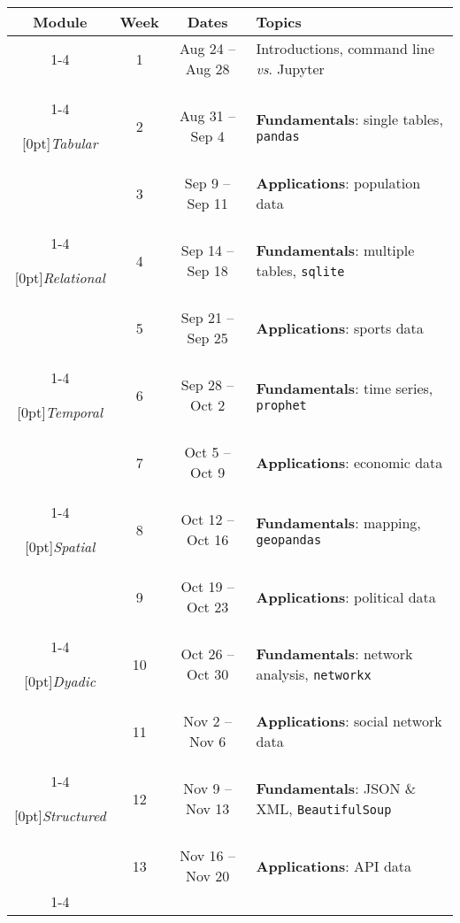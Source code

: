 \documentclass[10pt]{memoir}
\begin{document}
\begin{table}[h]
\centering
\begin{tabular}{cccl}
    \toprule[.15em]
    \textbf{Module} & \textbf{Week} & \textbf{Dates} & \textbf{Topics} \\
    \cmidrule[.1em](lr){1-4}
    
    & 1 & Aug 24 -- Aug 28 & Introductions, command line \textit{vs}. Jupyter \\
    \cmidrule[.1em](lr){1-4}
        
    \multirow{2}{*}[0pt]{\textit{Tabular}} %
        & 2 & Aug 31 -- Sep 4 & \textbf{Fundamentals}: single tables, \texttt{pandas} \\ 
        & 3 & Sep 9 -- Sep 11 & \textbf{Applications}: population data \\ \cmidrule[.1em](lr){1-4}
    
    \multirow{2}{*}[0pt]{\textit{Relational}} %
        & 4 & Sep 14 -- Sep 18 & \textbf{Fundamentals}: multiple tables, \texttt{sqlite} \\ 
        & 5 & Sep 21 -- Sep 25 & \textbf{Applications}: sports data \\ 
        \cmidrule[.1em](lr){1-4}
        
    \multirow{2}{*}[0pt]{\textit{Temporal}} %
        & 6 & Sep 28 -- Oct 2 & \textbf{Fundamentals}: time series, \texttt{prophet} \\
        & 7 & Oct 5 -- Oct 9 & \textbf{Applications}: economic data  \\ 
        \cmidrule[.1em](lr){1-4}
        
    \multirow{2}{*}[0pt]{\textit{Spatial}} %
        & 8 & Oct 12 -- Oct 16 & \textbf{Fundamentals}: mapping, \texttt{geopandas} \\
        & 9 & Oct 19 -- Oct 23 & \textbf{Applications}: political data \\ \cmidrule[.1em](lr){1-4}
    
    \multirow{2}{*}[0pt]{\textit{Dyadic}} %
        & 10 & Oct 26 -- Oct 30 & \textbf{Fundamentals}: network analysis, \texttt{networkx} \\
        & 11 & Nov 2 -- Nov 6 & \textbf{Applications}: social network data \\ \cmidrule[.1em](lr){1-4}
        
    \multirow{2}{*}[0pt]{\textit{Structured}} %
        & 12 & Nov 9 -- Nov 13 & \textbf{Fundamentals}: JSON \& XML, \texttt{BeautifulSoup} \\
        & 13 & Nov 16 -- Nov 20 & \textbf{Applications}: API data \\ 
        \cmidrule[.1em](lr){1-4}
    

\end{tabular}
\end{table}
\end{document}
